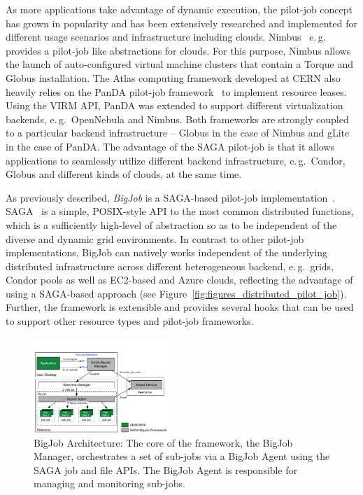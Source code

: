 \documentclass[conference,final]{IEEEtran}
\newcommand{\up}{\vspace*{-1em}}
\begin{document}
As more applications take advantage of dynamic execution, the
pilot-job concept has grown in popularity and has been extensively
researched and implemented for different usage scenarios and
infrastructure including clouds. 
Nimbus~\cite{10.1109/MIC.2009.94} e.\,g. provides a pilot-job like
abstractions for clouds. For this purpose, Nimbus allows the launch of
auto-configured virtual machine clusters that contain a Torque and
Globus installation.  The Atlas computing framework developed at CERN
also heavily relies on the PanDA pilot-job framework~\cite{1742-6596-219-6-062041} 
to implement resource leases. Using the VIRM API, PanDA was extended to support
different virtualization backends, e.\,g.\ OpenNebula and
Nimbus. Both frameworks are strongly coupled to a particular backend infrastructure
-- Globus in the case of Nimbus and gLite in the case of PanDA. The
advantage of the SAGA pilot-job is that it allows applications to
seamlessly utilize different backend infrastructure, e.\,g.\ Condor,
Globus and different kinds of clouds, at the same time.

As previously described, \emph{BigJob} is a SAGA-based 
pilot-job implementation~\cite{10.1109/CCGRID.2010.91}. 
SAGA~\cite{saga_url} is a simple, POSIX-style API to the most 
common distributed functions, which 
is a sufficiently high-level of abstraction so as to be 
independent of the diverse and dynamic grid environments. 
In contrast to other pilot-job implementations, BigJob can
natively works independent of the underlying distributed infrastructure across different
heterogeneous backend, e.\,g.\ grids, Condor pools as well as EC2-based and Azure clouds, 
reflecting the advantage of using a SAGA-based approach (see 
Figure~\ref{fig:figures_distributed_pilot_job}). Further, the framework is
extensible and provides several hooks that can be used to support
other resource types and pilot-job frameworks.

\begin{figure}[ht]
    \centering
    \includegraphics[width=0.45\textwidth]{figures/bigjob}
   \caption{BigJob Architecture: The core of the framework, the
      BigJob Manager, orchestrates a set of sub-jobs via a
      BigJob Agent using the SAGA job and file APIs.  The
      BigJob Agent is responsible for managing and monitoring sub-jobs.\up}
   \label{fig:figures_bigjob}   
\end{figure}
\end{document}

